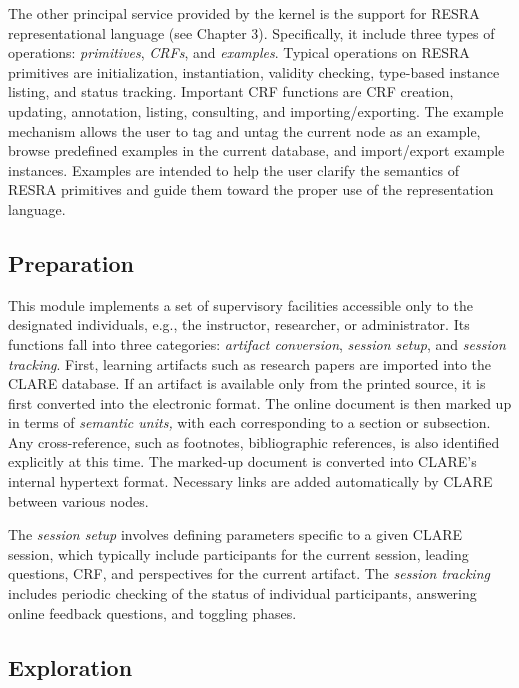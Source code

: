 The other principal service provided by the kernel is the support for RESRA
representational language (see Chapter 3).  Specifically, it include three
types of operations: {\it primitives\/}, {\it CRFs\/}, and {\it
examples\/}. Typical operations on RESRA primitives are initialization,
instantiation, validity checking, type-based instance listing, and status
tracking. Important CRF functions are CRF creation, updating, annotation,
listing, consulting, and importing/exporting. The example mechanism allows
the user to tag and untag the current node as an example, browse predefined
examples in the current database, and import/export example
instances. Examples are intended to help the user clarify the semantics of
RESRA primitives and guide them toward the proper use of the representation
language.


\subsection{Preparation}

This module implements a set of supervisory facilities accessible only to
the designated individuals, e.g., the instructor, researcher, or
administrator. Its functions fall into three categories: {\it artifact
conversion\/}, {\it session setup\/}, and {\it session tracking\/}. First,
learning artifacts such as research papers are imported into the CLARE
database. If an artifact is available only from the printed source, it is
first converted into the electronic format. The online document is then
marked up in terms of {\it semantic units,\/} with each corresponding to a
section or subsection. Any cross-reference, such as footnotes,
bibliographic references, is also identified explicitly at this time. The
marked-up document is converted into CLARE's internal hypertext format.
Necessary links are added automatically by CLARE  between various nodes.

The {\it session setup\/} involves defining parameters specific to a given
CLARE session, which typically include participants for the current
session, leading questions, CRF, and perspectives for the current artifact.
The {\it session tracking\/} includes periodic checking of the status of
individual participants, answering online feedback questions, and toggling
phases.


\subsection{Exploration}
\label{sec:exploration}

